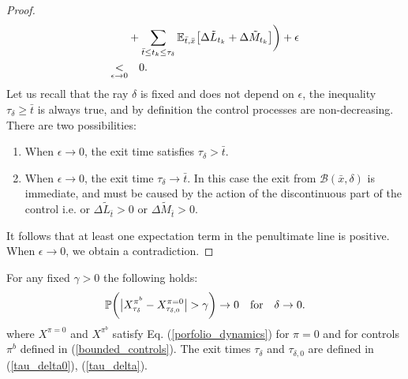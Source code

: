 \begin{proof}
\begin{align}
    & + \sum_{\bar t \leq t_k \leq \tau_{\delta}}  \mathbb{E}_{\bar t, \bar x} \bigl[ \Delta \tilde L_{t_k} + \Delta \tilde M_{t_k} \bigr]   \biggr) + \epsilon \\ \nonumber
    \underset{\epsilon \to 0}{<} & \quad 0.   
\end{align}
Let us recall that the ray $\delta$ is fixed and does not depend on $\epsilon$, the inequality $\tau_{\delta} \geq \bar t$ is always true, and 
by definition the control processes are non-decreasing.
There are two possibilities:
\begin{enumerate}
 \item When $\epsilon \to 0$, the exit time satisfies $\tau_{\delta} > \bar t$.  
 \item When $\epsilon \to 0$, the exit time $\tau_{\delta} \to \bar t$. In this case the exit from $\mathcal{B}(\bar x, \delta)$ is immediate, and must be caused by the action 
 of the discontinuous part of the control i.e. or $\Delta \tilde L_{\bar t} > 0$ or $\Delta \tilde M_{\bar t} > 0$.   
\end{enumerate}
It follows that at least one expectation term in the penultimate line is positive. When $\epsilon \to 0$, we obtain a contradiction.
\end{proof}


\begin{Lemma}\label{ball_theorem}
For any fixed $\gamma>0$ the following holds: 
$$ \mathbb{P} \biggl( \big| X^{\pi^b}_{\tau_{\delta}} - X^{\pi = 0}_{\tau_{\delta,0}} \big| > \gamma \biggr) \to 0 \quad \mbox{for} \quad \delta \to 0. $$ 
where $X^{\pi = 0}$ and $X^{\pi^b}$ satisfy Eq. (\ref{porfolio_dynamics}) for $\pi=0$ and for controls $\pi^b$ defined in (\ref{bounded_controls}). 
The exit times $\tau_{\delta}$ and $\tau_{\delta,0}$ are defined in (\ref{tau_delta0}), (\ref{tau_delta}).
\end{Lemma}

